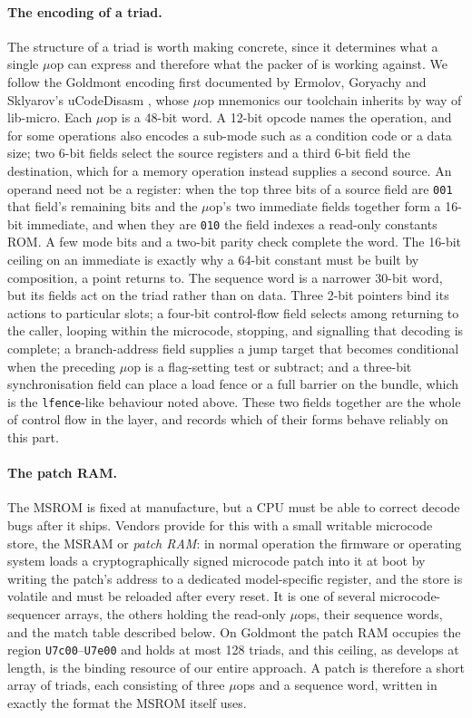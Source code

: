 \paragraph{The encoding of a triad.}
The structure of a triad is worth making concrete, since it determines what a
single $\mu$op can express and therefore what the packer of 
is working against. We follow the Goldmont encoding first documented by Ermolov,
Goryachy and Sklyarov's uCodeDisasm \cite{ermolovUCodeDisasm2021}, whose $\mu$op
mnemonics our toolchain inherits by way of lib-micro. Each $\mu$op is a 48-bit
word. A 12-bit opcode names the operation, and for some operations also encodes
a sub-mode such as a condition code or a data size; two 6-bit fields select the
source registers and a third 6-bit field the destination, which for a memory
operation instead supplies a second source. An operand need not be a register:
when the top three bits of a source field are \texttt{001} that field's
remaining bits and the $\mu$op's two immediate fields together form a 16-bit
immediate, and when they are \texttt{010} the field indexes a read-only
constants ROM. A few mode bits and a two-bit parity check complete the word. The
16-bit ceiling on an immediate is exactly why a 64-bit constant must be built by
composition, a point  returns to. The sequence word is a
narrower 30-bit word, but its fields act on the triad rather than on data.
Three 2-bit pointers bind its actions to particular slots; a four-bit
control-flow field selects among returning to the caller, looping within the
microcode, stopping, and signalling that decoding is complete; a branch-address
field supplies a jump target that becomes conditional when the preceding $\mu$op
is a flag-setting test or subtract; and a three-bit synchronisation field can
place a load fence or a full barrier on the bundle, which is the
\texttt{lfence}-like behaviour noted above. These two fields together are the
whole of control flow in the layer, and  records which of
their forms behave reliably on this part.

\paragraph{The patch RAM.}
The MSROM is fixed at manufacture, but a CPU must be able to correct decode
bugs after it ships. Vendors provide for this with a small writable microcode
store, the MSRAM or \emph{patch RAM}: in normal operation the firmware or
operating system loads a cryptographically signed microcode patch into it at
boot by writing the patch's address to a dedicated model-specific register, and
the store is volatile and must be reloaded after every reset. It is one of
several microcode-sequencer arrays, the others holding the read-only $\mu$ops,
their sequence words, and the match table described below. On Goldmont the patch
RAM occupies the region \texttt{U7c00}--\texttt{U7e00} and holds at most 128
triads, and this ceiling, as  develops at length, is the
binding resource of our entire approach. A patch is therefore a short array of
triads, each consisting of three $\mu$ops and a sequence word, written in
exactly the format the MSROM itself uses.

